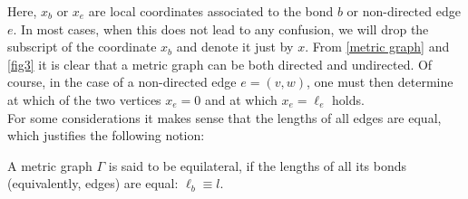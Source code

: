 Here, $x_b$ or $x_e$ are local coordinates associated to the bond $b$ or non-directed edge $e$. In most cases, when this does not lead to any confusion, we will drop the subscript of the coordinate $x_b$ and denote it just by $x$. From \cref{metric graph} and \cref{fig3} it is clear that a metric graph can be both directed and undirected. Of course, in the case of a non-directed edge $e = (v, w)$, one must then determine at which of the two vertices $x_e = 0$ and at which $x_e = \ell_e$ holds. \\
For some considerations it makes sense that the lengths of all edges are equal, which justifies the following notion:

\begin{definition}
    \label{metric graph equilateral}
    A metric graph $\Gamma$ is said to be equilateral, if the lengths of all its bonds (equivalently, edges) are equal: $\ell_b \equiv l$.
\end{definition}

